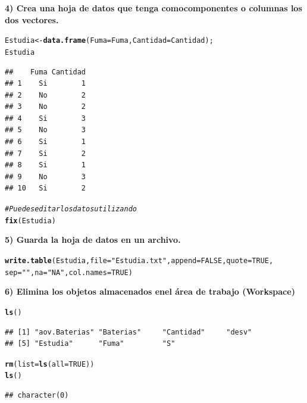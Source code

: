 \documentclass[12pt,letterpaper]{article}\usepackage[]{graphicx}\usepackage[]{color}
\makeatletter
\newcommand{\hlnum}[1]{\textcolor[rgb]{0.686,0.059,0.569}{#1}}%
\newcommand{\hlstr}[1]{\textcolor[rgb]{0.192,0.494,0.8}{#1}}%
\newcommand{\hlcom}[1]{\textcolor[rgb]{0.678,0.584,0.686}{\textit{#1}}}%
\newcommand{\hlstd}[1]{\textcolor[rgb]{0.345,0.345,0.345}{#1}}%
\newcommand{\hlkwb}[1]{\textcolor[rgb]{0.69,0.353,0.396}{#1}}%
\newcommand{\hlkwc}[1]{\textcolor[rgb]{0.333,0.667,0.333}{#1}}%
\newcommand{\hlkwd}[1]{\textcolor[rgb]{0.737,0.353,0.396}{\textbf{#1}}}%
\newenvironment{kframe}{%
 \def\at@end@of@kframe{}%
 \ifinner\ifhmode%
  \def\at@end@of@kframe{\end{minipage}}%
  \begin{minipage}{\columnwidth}%
 \fi\fi%
 \def\FrameCommand##1{\hskip\@totalleftmargin \hskip-\fboxsep
 \colorbox{shadecolor}{##1}\hskip-\fboxsep
     \hskip-\linewidth \hskip-\@totalleftmargin \hskip\columnwidth}%
 \MakeFramed {\advance\hsize-\width
   \@totalleftmargin\z@ \linewidth\hsize
   \@setminipage}}%
 {\par\unskip\endMakeFramed%
 \at@end@of@kframe}
\newenvironment{knitrout}{}{} %
\makeatother
\begin{document}
\textbf{4) Crea una hoja de datos que tenga comocomponentes o columnas los dos vectores.} 
\begin{knitrout}
\color{fgcolor}\begin{kframe}
\begin{alltt}
\hlstd{Estudia} \hlkwb{<-} \hlkwd{data.frame}\hlstd{(}\hlkwc{Fuma}\hlstd{=Fuma,} \hlkwc{Cantidad}\hlstd{=Cantidad);}
\hlstd{Estudia}
\end{alltt}
\begin{verbatim}
##    Fuma Cantidad
## 1    Si        1
## 2    No        2
## 3    No        2
## 4    Si        3
## 5    No        3
## 6    Si        1
## 7    Si        2
## 8    Si        1
## 9    No        3
## 10   Si        2
\end{verbatim}
\begin{alltt}
\hlcom{# Puedes editar los datos utilizando }
\hlkwd{fix}\hlstd{(Estudia)}
\end{alltt}
\end{kframe}
\end{knitrout}

\textbf {5) Guarda la hoja de datos en un archivo.}  
\begin{knitrout}
\color{fgcolor}\begin{kframe}
\begin{alltt}
\hlkwd{write.table}\hlstd{(Estudia,} \hlkwc{file}\hlstd{=}\hlstr{"Estudia.txt"}\hlstd{,} \hlkwc{append}\hlstd{=}\hlnum{FALSE}\hlstd{,} \hlkwc{quote}\hlstd{=}\hlnum{TRUE}\hlstd{,}
            \hlkwc{sep}\hlstd{=}\hlstr{" "}\hlstd{,} \hlkwc{na}\hlstd{=}\hlstr{"NA"}\hlstd{,} \hlkwc{col.names}\hlstd{=}\hlnum{TRUE}\hlstd{)}
\end{alltt}
\end{kframe}
\end{knitrout}

\textbf {6) Elimina los objetos almacenados enel \'area de trabajo (Workspace)}
\begin{knitrout}
\color{fgcolor}\begin{kframe}
\begin{alltt}
\hlkwd{ls}\hlstd{()}
\end{alltt}
\begin{verbatim}
## [1] "aov.Baterias" "Baterias"     "Cantidad"     "desv"        
## [5] "Estudia"      "Fuma"         "S"
\end{verbatim}
\begin{alltt}
\hlkwd{rm}\hlstd{(}\hlkwc{list}\hlstd{=}\hlkwd{ls}\hlstd{(}\hlkwc{all}\hlstd{=}\hlnum{TRUE}\hlstd{))}
\hlkwd{ls}\hlstd{()}
\end{alltt}
\begin{verbatim}
## character(0)
\end{verbatim}
\end{kframe}
\end{knitrout}
\end{document}
